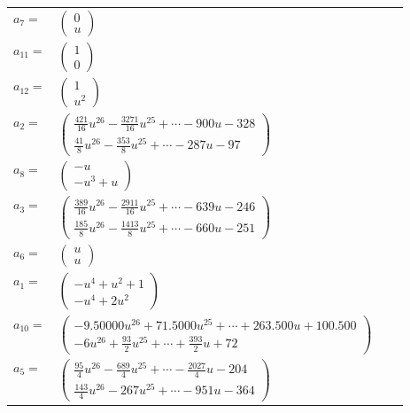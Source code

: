 \documentclass[1p]{elsarticle_modified}
\theoremstyle{definition}
\begin{document}
\begin{tabular}{m{7pt} m{180pt} m{7pt} m{180pt} }
\flushright $a_{7}=$&$\begin{pmatrix}0\\u\end{pmatrix}$ \\
\flushright $a_{11}=$&$\begin{pmatrix}1\\0\end{pmatrix}$ \\
\flushright $a_{12}=$&$\begin{pmatrix}1\\u^2\end{pmatrix}$ \\
\flushright $a_{2}=$&$\begin{pmatrix}\frac{421}{16} u^{26}-\frac{3271}{16} u^{25}+\cdots-900 u-328\\\frac{41}{8} u^{26}-\frac{353}{8} u^{25}+\cdots-287 u-97\end{pmatrix}$ \\
\flushright $a_{8}=$&$\begin{pmatrix}- u\\- u^3+u\end{pmatrix}$ \\
\flushright $a_{3}=$&$\begin{pmatrix}\frac{389}{16} u^{26}-\frac{2911}{16} u^{25}+\cdots-639 u-246\\\frac{185}{8} u^{26}-\frac{1413}{8} u^{25}+\cdots-660 u-251\end{pmatrix}$ \\
\flushright $a_{6}=$&$\begin{pmatrix}u\\u\end{pmatrix}$ \\
\flushright $a_{1}=$&$\begin{pmatrix}- u^4+u^2+1\\- u^4+2 u^2\end{pmatrix}$ \\
\flushright $a_{10}=$&$\begin{pmatrix}-9.50000 u^{26}+71.5000 u^{25}+\cdots+263.500 u+100.500\\-6 u^{26}+\frac{93}{2} u^{25}+\cdots+\frac{393}{2} u+72\end{pmatrix}$ \\
\flushright $a_{5}=$&$\begin{pmatrix}\frac{95}{4} u^{26}-\frac{689}{4} u^{25}+\cdots-\frac{2027}{4} u-204\\\frac{143}{4} u^{26}-267 u^{25}+\cdots-951 u-364\end{pmatrix}$ \\

\end{tabular}
\end{document}
